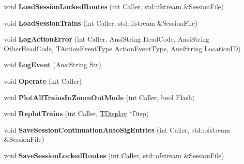 \begin{DoxyCompactItemize}
\mbox{\label{class_t_train_controller_aefaafd5c6d1c51b4db9dd4b3646d0312}} 
void {\bfseries Load\+Session\+Locked\+Routes} (int Caller, std\+::ifstream \&Session\+File)
\item 
\mbox{\label{class_t_train_controller_a853ddf9799c9fd7063c81ffa1dc754d7}} 
void {\bfseries Load\+Session\+Trains} (int Caller, std\+::ifstream \&Session\+File)
\item 
\mbox{\label{class_t_train_controller_a9acd46962be476bc76c8d5ce59fff399}} 
void {\bfseries Log\+Action\+Error} (int Caller, Ansi\+String Head\+Code, Ansi\+String Other\+Head\+Code, T\+Action\+Event\+Type Action\+Event\+Type, Ansi\+String Location\+ID)
\item 
\mbox{\label{class_t_train_controller_ac88477499edd24550fae9b90b5561ed1}} 
void {\bfseries Log\+Event} (Ansi\+String Str)
\item 
\mbox{\label{class_t_train_controller_a20a1576dea1d86ed78fc5e9f46343481}} 
void {\bfseries Operate} (int Caller)
\item 
\mbox{\label{class_t_train_controller_a2f9cd71b60b45de8380f5fad7bbd5dd8}} 
void {\bfseries Plot\+All\+Trains\+In\+Zoom\+Out\+Mode} (int Caller, bool Flash)
\item 
\mbox{\label{class_t_train_controller_a47676de8fc677dbcabf565569cb1435c}} 
void {\bfseries Replot\+Trains} (int Caller, \mbox{\hyperlink{class_t_display}{T\+Display}} $\ast$Disp)
\item 
\mbox{\label{class_t_train_controller_ab81acdc0c0ab6e1e321f64170f0f71af}} 
void {\bfseries Save\+Session\+Continuation\+Auto\+Sig\+Entries} (int Caller, std\+::ofstream \&Session\+File)
\item 
\mbox{\label{class_t_train_controller_a57a934999d63367128ca639b9ab3e3ce}} 
void {\bfseries Save\+Session\+Locked\+Routes} (int Caller, std\+::ofstream \&Session\+File)
\item 
\mbox{\label{class_t_train_controller_afa594bfc6b628d21d02a31c3a13c3a0a}} 

\end{DoxyCompactItemize}
